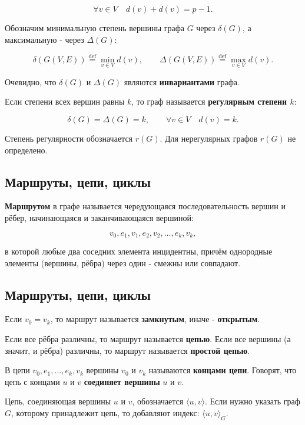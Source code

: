 {\[
\forall v \in V\quad d(v) + \overline{d}(v) = p - 1.
\]



Обозначим минимальную степень вершины графа $G$ через $\delta(G)$, а максимальную - через $\Delta(G)$:


\[
\delta(G(V, E)) \overset{\text{def}}{=} \min_{v \in V} d(v),\qquad
\Delta(G(V, E)) \overset{\text{def}}{=} \max_{v \in V} d(v).
\]



Очевидно, что $\delta(G)$ и $\Delta(G)$ являются \textbf{инвариантами} графа.

Если степени всех вершин равны $k$, то граф называется \textbf{регулярным степени $k$}:


\[
\delta(G) = \Delta(G) = k,\qquad \forall v \in V\quad d(v) = k.
\]



Степень регулярности обозначается $r(G)$. Для нерегулярных графов $r(G)$ не определено.

\subsection*{Маршруты, цепи, циклы}

\textbf{Маршрутом} в графе называется чередующаяся последовательность вершин и рёбер, начинающаяся и заканчивающаяся вершиной:


\[
v_0, e_1, v_1, e_2, v_2, \dots, e_k, v_k,
\]


в которой любые два соседних элемента инцидентны, причём однородные элементы (вершины, рёбра) через один - смежны или совпадают.

\subsection*{Маршруты, цепи, циклы}

Если $v_0 = v_k$, то маршрут называется \textbf{замкнутым}, иначе - \textbf{открытым}.

Если все рёбра различны, то маршрут называется \textbf{цепью}.  
Если все вершины (а значит, и рёбра) различны, то маршрут называется \textbf{простой цепью}.

В цепи $v_0, e_1, \ldots, e_k, v_k$ вершины $v_0$ и $v_k$ называются \textbf{концами цепи}.  
Говорят, что цепь с концами $u$ и $v$ \textbf{соединяет вершины} $u$ и $v$.

Цепь, соединяющая вершины $u$ и $v$, обозначается $\langle u, v \rangle$.  
Если нужно указать граф $G$, которому принадлежит цепь, то добавляют индекс: $\langle u, v \rangle_G$.

}
